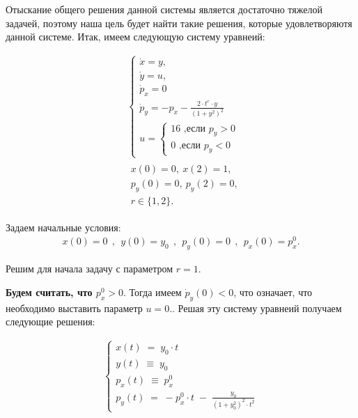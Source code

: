 \documentclass[a4paper,12pt]{article}
\begin{document}
Отыскание общего решения данной системы является достаточно тяжелой задачей, поэтому наша цель будет найти такие решения, которые удовлетворяютя данной системе. Итак, имеем следующую систему уравнеий:

\begin{align*}
    &\left\{
        \begin{array}{l}
            \dot x =y,\\
            \dot y= u,\\
            \dot p_x= 0\\
            \dot p_y= -p_x -\frac{2\cdot t^r \cdot y}{{(1+y^2)}^2}\\
            u=\left\{
            \begin{array}{l}
                16 \text{ ,если } p_y>0 \\
                0 \text{ ,если } p_y<0
            \end{array}
            \right.
        \end{array}
    \right.
    \\
    &\begin{array}{l}
        x(0)=0, \: x(2)=1,\\
        p_y(0)=0, \: p_y(2)=0,\\
        r \in \{1, 2\}.
    \end{array}
\end{align*}

Задаем начальные условия:
\begin{align}
    x(0)=0\:\:,\:\:y(0)=y_0\:\:,\:\:p_y(0)=0\:\:,\:\:p_x(0)=p_x^0.
\end{align}

Решим для начала задачу с параметром $r=1.$

\textbf{Будем считать, что $p_x^0 > 0.$} Тогда имеем $\dot p_y(0)<0$, что означает, что необходимо выставить параметр $u=0.$. Решая эту систему уравнеий получаем следующие решения:

\begin{align*}
    \left\{
        \begin{array}{l}
            x(t)\;=\; y_0\cdot t\\
            y(t)\; \equiv \; y_0\\
            p_x(t)\;\equiv \; p_x^0\\
            p_y(t)\; =\; -p_x^0\cdot t\;-\;\frac{y_0}{(1+y_0^2)^2\cdot t^2}
        \end{array}
    \right.
\end{align*}
\end{document}
